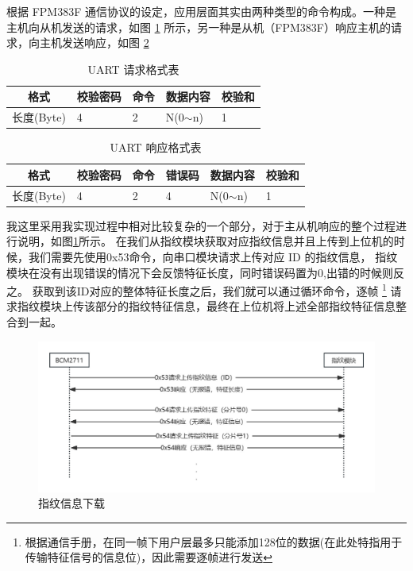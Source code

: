     根据 FPM383F 通信协议的设定，应用层面其实由两种类型的命令构成。一种是主机向从机发送的请求，如图 \ref{FPM383F::UARTUserRequest}
    所示，另一种是从机（FPM383F）响应主机的请求，向主机发送响应，如图 \ref{FPM383F::UARTUserResponse}

    \begin{table}[ht]
        \centering
        \begin{tabular}{|l|l|l|l|l|}
        \hline
        \multicolumn{1}{|c|}{格式} & 校验密码 & 命令 & 数据内容        & 校验和 \\ \hline
        长度(Byte)                 & 4    & 2  & N(0$\sim$n) & 1   \\ \hline
        \end{tabular}
        \caption{UART 请求格式表} \label{FPM383F::UARTUserRequest}
    \end{table}

    \begin{table}[ht]
        \centering
        \begin{tabular}{|l|l|l|l|l|l|}
        \hline
        \multicolumn{1}{|c|}{格式} & 校验密码 & 命令 & 错误码 & 数据内容        & 校验和 \\ \hline
        长度(Byte)                 & 4    & 2  & 4   & N(0$\sim$n) & 1   \\ \hline
        \end{tabular}
        \caption{UART 响应格式表} \label{FPM383F::UARTUserResponse}
    \end{table}

    我这里采用我实现过程中相对比较复杂的一个部分，对于主从机响应的整个过程进行说明，如图\ref{FPM383F::DownloadFingerPrintInfo}所示。
    在我们从指纹模块获取对应指纹信息并且上传到上位机的时候，我们需要先使用0x53命令，向串口模块请求上传对应 ID 的指纹信息，
    指纹模块在没有出现错误的情况下会反馈特征长度，同时错误码置为0,出错的时候则反之。
    获取到该ID对应的整体特征长度之后，我们就可以通过循环命令，逐帧
    \footnote{根据通信手册，在同一帧下用户层最多只能添加128位的数据(在此处特指用于传输特征信号的信息位)，因此需要逐帧进行发送}
    请求指纹模块上传该部分的指纹特征信息，最终在上位机将上述全部指纹特征信息整合到一起。

    \begin{figure}[H]
        \centering
        \includegraphics[scale=0.4]{./imgs/指纹信息下载.jpg}
        \caption{指纹信息下载}    \label{FPM383F::DownloadFingerPrintInfo}
    \end{figure}    

